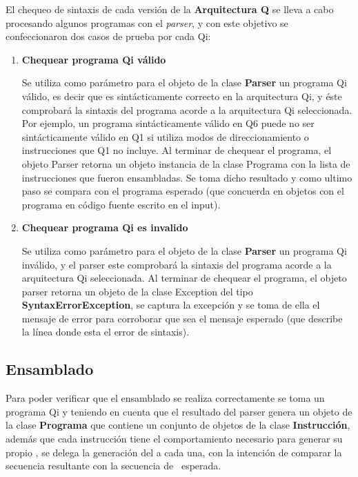 El chequeo de sintaxis de cada versión de la \textbf{Arquitectura Q} se lleva a cabo procesando algunos programas con el \textit{parser}, y con este objetivo se confeccionaron  dos casos de prueba por cada Qi:
\begin{enumerate}
\item \textbf{Chequear programa Qi válido}

Se utiliza como parámetro para el objeto de la clase \textbf{Parser} un programa Qi válido, es decir que es sintácticamente correcto en la arquitectura Qi, y éste comprobará la sintaxis del programa acorde a la arquitectura Qi seleccionada. Por ejemplo, un programa sintácticamente válido en Q6 puede no ser sintácticamente válido en Q1 si utiliza modos de direccionamiento o instrucciones que Q1 no incluye. Al terminar de chequear el programa, el objeto Parser retorna un objeto instancia de la clase Programa con la lista de instrucciones que fueron ensambladas. 
Se toma dicho resultado y como ultimo paso se compara con el programa esperado (que concuerda en objetos con el programa en código fuente escrito en el input).


\item \textbf{Chequear programa Qi es invalido} 

Se utiliza como parámetro para el objeto de la clase \textbf{Parser}  un programa Qi inválido, y el parser este comprobará la sintaxis del programa acorde a la arquitectura Qi seleccionada. Al terminar de chequear el programa, el objeto parser retorna un objeto de la clase Exception del tipo \textbf{SyntaxErrorException}, se captura la excepción y se toma de ella el mensaje de error para corroborar que sea el mensaje esperado (que describe la línea donde esta el error de sintaxis).

\end{enumerate}
\subsection{Ensamblado}

Para poder verificar que el ensamblado se realiza correctamente se toma un programa Qi y teniendo en cuenta que el resultado del parser genera un objeto de la clase \textbf{Programa} que contiene un conjunto de objetos de la clase \textbf{Instrucción}, además que cada instrucción tiene el comportamiento necesario para generar su propio \codmaq, se delega la generación del \codmaq a cada una, con la intención de comparar la secuencia resultante con la secuencia de \codmaq\ esperada.

